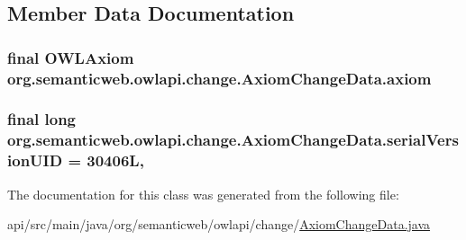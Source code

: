 \subsection{Member Data Documentation}
\hypertarget{classorg_1_1semanticweb_1_1owlapi_1_1change_1_1_axiom_change_data_acecb42f3fae836ede3fc37f8c4feb4e4}{
\subsubsection[{axiom}]{\setlength{\rightskip}{0pt plus 5cm}final {\bf O\-W\-L\-Axiom} org.\-semanticweb.\-owlapi.\-change.\-Axiom\-Change\-Data.\-axiom\hspace{0.3cm}{\ttfamily [private]}}}\label{classorg_1_1semanticweb_1_1owlapi_1_1change_1_1_axiom_change_data_acecb42f3fae836ede3fc37f8c4feb4e4}
\hypertarget{classorg_1_1semanticweb_1_1owlapi_1_1change_1_1_axiom_change_data_a377e8e574dfe56215f84b708b0024e2d}{
\subsubsection[{serial\-Version\-U\-I\-D}]{\setlength{\rightskip}{0pt plus 5cm}final long org.\-semanticweb.\-owlapi.\-change.\-Axiom\-Change\-Data.\-serial\-Version\-U\-I\-D = 30406\-L\hspace{0.3cm}{\ttfamily [static]}, {\ttfamily [private]}}}\label{classorg_1_1semanticweb_1_1owlapi_1_1change_1_1_axiom_change_data_a377e8e574dfe56215f84b708b0024e2d}


The documentation for this class was generated from the following file\-:\begin{DoxyCompactItemize}
\item 
api/src/main/java/org/semanticweb/owlapi/change/\hyperlink{_axiom_change_data_8java}{Axiom\-Change\-Data.\-java}\end{DoxyCompactItemize}
